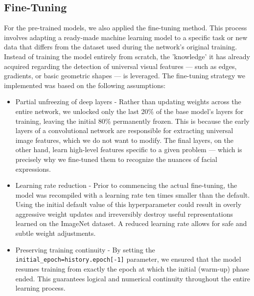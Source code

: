 \documentclass{article}
\begin{document}
\subsection{Fine-Tuning}
For the pre-trained models, we also applied the fine-tuning method. This process involves adapting a ready-made machine learning model to a specific task or new data that differs from the dataset used during the network's original training. Instead of training the model entirely from scratch, the 'knowledge' it has already acquired regarding the detection of universal visual features — such as edges, gradients, or basic geometric shapes — is leveraged. The fine-tuning strategy we implemented was based on the following assumptions:
\begin{itemize}
    \item Partial unfreezing of deep layers - Rather than updating weights across the entire network, we unlocked only the last 20\% of the base model's layers for training, leaving the initial 80\% permanently frozen. This is because the early layers of a convolutional network are responsible for extracting universal image features, which we do not want to modify. The final layers, on the other hand, learn high-level features specific to a given problem — which is precisely why we fine-tuned them to recognize the nuances of facial expressions.
    \item Learning rate reduction - Prior to commencing the actual fine-tuning, the model was recompiled with a learning rate ten times smaller than the default. Using the initial default value of this hyperparameter could result in overly aggressive weight updates and irreversibly destroy useful representations learned on the ImageNet dataset. A reduced learning rate allows for safe and subtle weight adjustments.
  \item Preserving training continuity -  By setting the \texttt{initial\_epoch=history.epoch[-1]} parameter, we ensured that the model resumes training from exactly the epoch at which the initial (warm-up) phase ended. This guarantees logical and numerical continuity throughout the entire learning process.
\end{itemize}
\end{document}
